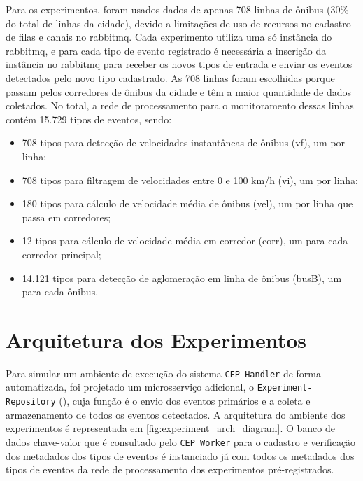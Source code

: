 Para os experimentos, foram usados dados de apenas 708 linhas de ônibus (30\% do total de linhas da cidade), devido a limitações de uso de recursos no cadastro de filas e canais no rabbitmq. Cada experimento utiliza uma só instância do rabbitmq, e para cada tipo de evento registrado é necessária a inscrição da instância no rabbitmq para receber os novos tipos de entrada e enviar os eventos detectados pelo novo tipo cadastrado. As 708 linhas foram escolhidas porque passam pelos corredores de ônibus da cidade e têm a maior quantidade de dados coletados. No total, a rede de processamento para o monitoramento dessas linhas contém 15.729 tipos de eventos, sendo:
\begin{itemize}
    \item 708 tipos para detecção de velocidades instantâneas de ônibus (vf), um por linha;
    \item 708 tipos para filtragem de velocidades entre 0 e 100 km/h (vi), um por linha;
    \item 180 tipos para cálculo de velocidade média de ônibus (vel), um por linha que passa em corredores;
    \item 12 tipos para cálculo de velocidade média em corredor (corr), um para cada corredor principal;
    \item 14.121 tipos para detecção de aglomeração em linha de ônibus (busB), um para cada ônibus.
\end{itemize}


\section{Arquitetura dos Experimentos}
\label{sec:experiment_architecture}
Para simular um ambiente de execução do sistema \texttt{CEP Handler} de forma automatizada, foi projetado um microsserviço adicional, o \texttt{Experiment-Repository} (\cite{Experiment-Repository}), cuja função é o envio dos eventos primários e a coleta e armazenamento de todos os eventos detectados. A arquitetura do ambiente dos experimentos é representada em \autoref{fig:experiment_arch_diagram}.
O banco de dados chave-valor que é consultado pelo \texttt{CEP Worker} para o cadastro e verificação dos metadados dos tipos de eventos é instanciado já com todos os metadados dos tipos de eventos da rede de processamento dos experimentos pré-registrados.

